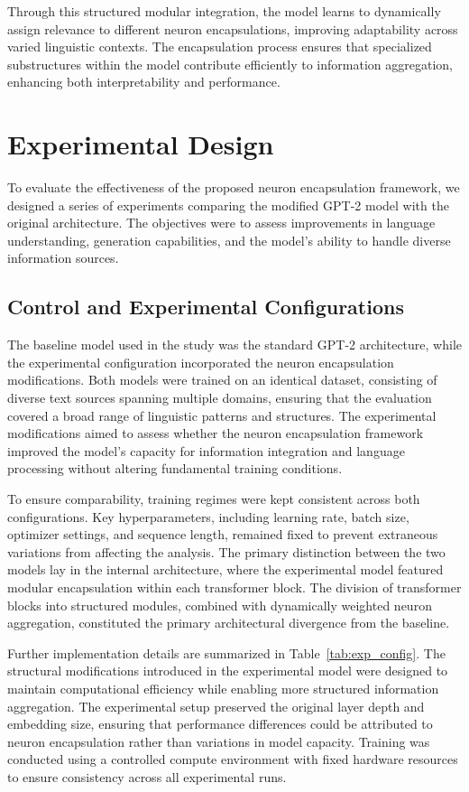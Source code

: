 \documentclass{article}
\begin{document}
Through this structured modular integration, the model learns to dynamically assign relevance to different neuron encapsulations, improving adaptability across varied linguistic contexts. The encapsulation process ensures that specialized substructures within the model contribute efficiently to information aggregation, enhancing both interpretability and performance.


\section{Experimental Design}

To evaluate the effectiveness of the proposed neuron encapsulation framework, we designed a series of experiments comparing the modified GPT-2 model with the original architecture. The objectives were to assess improvements in language understanding, generation capabilities, and the model's ability to handle diverse information sources.

\subsection{Control and Experimental Configurations}

The baseline model used in the study was the standard GPT-2 architecture, while the experimental configuration incorporated the neuron encapsulation modifications. Both models were trained on an identical dataset, consisting of diverse text sources spanning multiple domains, ensuring that the evaluation covered a broad range of linguistic patterns and structures. The experimental modifications aimed to assess whether the neuron encapsulation framework improved the model’s capacity for information integration and language processing without altering fundamental training conditions.

To ensure comparability, training regimes were kept consistent across both configurations. Key hyperparameters, including learning rate, batch size, optimizer settings, and sequence length, remained fixed to prevent extraneous variations from affecting the analysis. The primary distinction between the two models lay in the internal architecture, where the experimental model featured modular encapsulation within each transformer block. The division of transformer blocks into structured modules, combined with dynamically weighted neuron aggregation, constituted the primary architectural divergence from the baseline.

Further implementation details are summarized in Table~\ref{tab:exp_config}. The structural modifications introduced in the experimental model were designed to maintain computational efficiency while enabling more structured information aggregation. The experimental setup preserved the original layer depth and embedding size, ensuring that performance differences could be attributed to neuron encapsulation rather than variations in model capacity. Training was conducted using a controlled compute environment with fixed hardware resources to ensure consistency across all experimental runs.
\end{document}
